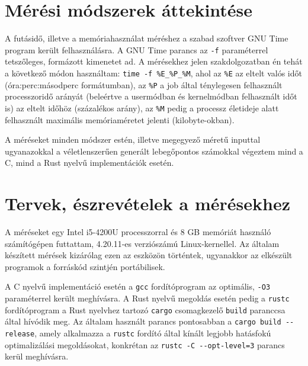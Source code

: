 

\section{Mérési módszerek áttekintése}
A futásidő, illetve a memóriahasználat méréshez a szabad szoftver GNU Time program került felhasználásra. A GNU Time parancs az \lstinline{-f} paraméterrel tetszőleges, formázott kimenetet ad. A mérésekhez jelen szakdolgozatban én tehát a következő módon használtam: \lstinline{time -f %E_%P_%M}, ahol az \lstinline{%E} az eltelt valós időt (óra:perc:másodperc formátumban), az \lstinline{%P} a job által ténylegesen felhasznált processzoridő arányát (beleértve a usermódban és kernelmódban felhasznált időt is) az eltelt időhöz (százalékos arány), az \lstinline{%M} pedig a processz életideje alatt felhasznált maximális memóriaméretet jelenti (kilobyte-okban).

A méréseket minden módszer estén, illetve megegyező méretű inputtal ugyanazokkal a véletlenszerűen generált lebegőpontos számokkal végeztem mind a C, mind a Rust nyelvű implementációk esetén.

\section{Tervek, észrevételek a mérésekhez}
A méréseket egy Intel i5-4200U processzorral és 8 GB memóriát használó számítógépen futtattam, 4.20.11-es verziószámú Linux-kernellel. Az általam készített mérések kizárólag ezen az eszközön történtek, ugyanakkor az elkészült programok a forráskód szintjén portábilisek.

A C nyelvű implementáció esetén a \lstinline{gcc} fordítóprogram az optimális, \lstinline{-O3} paraméterrel került meghívásra. A Rust nyelvű megoldás esetén pedig a \lstinline{rustc} fordítóprogram a Rust nyelvhez tartozó \lstinline{cargo} csomagkezelő \lstinline{build} paranccsa által hívódik meg. Az általam használt parancs pontosabban a \lstinline{cargo build --release}, amely alkalmazza a \lstinline{rustc} fordító által kínált legjobb hatásfokú optimalizálási megoldásokat, konkrétan az \lstinline{rustc -C --opt-level=3} parancs kerül meghívásra.
